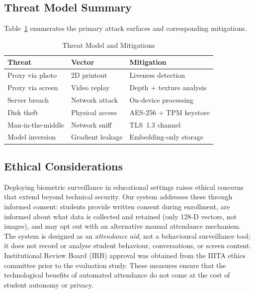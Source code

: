 \documentclass[conference, 10pt]{IEEEtran}
\begin{document}
\subsection{Threat Model Summary}

Table~\ref{tab:threats} enumerates the primary attack surfaces and corresponding mitigations.

\begin{table}[htbp]
\centering
\caption{Threat Model and Mitigations}
\label{tab:threats}
\begin{tabular}{p{2.5cm} p{2.2cm} p{2.5cm}}
\toprule
\textbf{Threat} & \textbf{Vector} & \textbf{Mitigation} \\
\midrule
Proxy via photo & 2D printout & Liveness detection \\
Proxy via screen & Video replay & Depth + texture analysis \\
Server breach & Network attack & On-device processing \\
Disk theft & Physical access & AES-256 + TPM keystore \\
Man-in-the-middle & Network sniff & TLS~1.3 channel \\
Model inversion & Gradient leakage & Embedding-only storage \\
\bottomrule
\end{tabular}
\end{table}

\subsection{Ethical Considerations}

Deploying biometric surveillance in educational settings raises ethical concerns that extend
beyond technical security.  Our system addresses these through informed consent: students
provide written consent during enrollment, are informed about what data is collected and
retained (only 128-D vectors, not images), and may opt out with an alternative manual
attendance mechanism.  The system is designed as an \emph{attendance aid}, not a behavioural
surveillance tool; it does not record or analyse student behaviour, conversations, or screen
content.  Institutional Review Board (IRB) approval was obtained from the IIITA ethics
committee prior to the evaluation study.  These measures ensure that the technological benefits
of automated attendance do not come at the cost of student autonomy or privacy.

\end{document}
